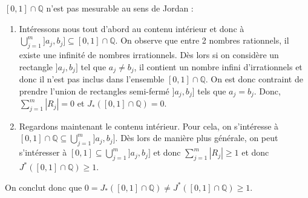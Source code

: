 \begin{example}
    $[0,1]\cap\mathbb{Q}$ n'est pas mesurable au sens de Jordan :
    \begin{enumerate}[label=(\roman*)]
        \item Intéressons nous tout d'abord au contenu intérieur et donc à $\bigcup_{j=1}^m]a_j,b_j]\subseteq[0,1]\cap\mathbb{Q}$. On observe que entre 2 nombres rationnels, il existe une infinité de nombres irrationnels. Dès lors si on considère un rectangle $]a_j,b_j]$ tel que $a_j\neq b_j$, il contient un nombre infini d'irrationnels et donc il n'est pas inclus dans l'ensemble $[0,1]\cap\mathbb{Q}$. On est donc contraint de prendre l'union de rectangles semi-fermé $]a_j,b_j]$ tels que $a_j=b_j$. Donc, $\sum_{j=1}^m|R_j| = 0$ et $J_*([0,1]\cap\mathbb{Q}) = 0$.
        \item Regardons maintenant le contenu intérieur. Pour cela, on s'intéresse à $[0,1]\cap\mathbb{Q}\subseteq\bigcup_{j=1}^m]a_j,b_j]$. Dès lors de manière plus générale, on peut s'intéresser à $[0,1]\subseteq\bigcup_{j=1}^m]a_j,b_j]$ et donc $\sum_{j=1}^m|R_j| \geq 1$ et donc $J^*([0,1]\cap\mathbb{Q}) \geq 1$.
    \end{enumerate}
    On conclut donc que $0 = J_*([0,1]\cap\mathbb{Q}) \neq J^*([0,1]\cap\mathbb{Q}) \geq 1$.
\end{example}

